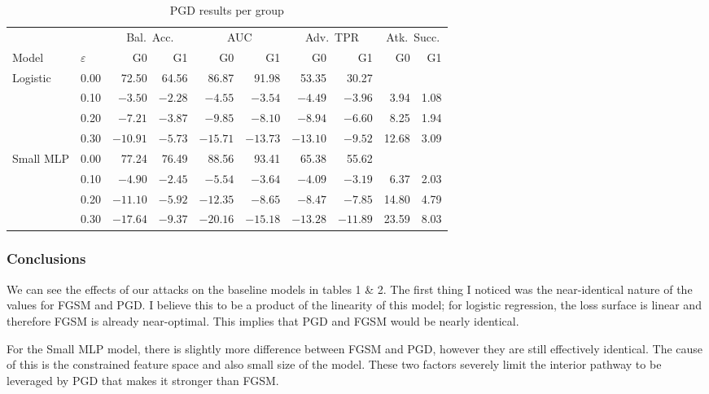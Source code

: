 \documentclass[11pt]{article}
\begin{document}
\begin{table}[H]
\centering
\caption{PGD results per group}
\label{tab:pgd-by-group}
\setlength{\tabcolsep}{4pt}
\begin{tabular}{ll rr rr rr rr}
\toprule
 & & \multicolumn{2}{c}{Bal.\ Acc.} & \multicolumn{2}{c}{AUC}
   & \multicolumn{2}{c}{Adv.\ TPR} & \multicolumn{2}{c}{Atk.\ Succ.} \\
\cmidrule(lr){3-4}\cmidrule(lr){5-6}\cmidrule(lr){7-8}\cmidrule(lr){9-10}
Model & $\varepsilon$ & G0 & G1 & G0 & G1 & G0 & G1 & G0 & G1 \\
\midrule
\multirow{4}{*}{Logistic}
 & 0.00 & 72.50 & 64.56 & 86.87 & 91.98 & 53.35 & 30.27 & & \\
 & 0.10 & $-3.50$ & $-2.28$ & $-4.55$ & $-3.54$ & $-4.49$ & $-3.96$ & 3.94 & 1.08 \\
 & 0.20 & $-7.21$ & $-3.87$ & $-9.85$ & $-8.10$ & $-8.94$ & $-6.60$ & 8.25 & 1.94 \\
 & 0.30 & $-10.91$ & $-5.73$ & $-15.71$ & $-13.73$ & $-13.10$ & $-9.52$ & 12.68 & 3.09 \\
\midrule
\multirow{4}{*}{Small MLP}
 & 0.00 & 77.24 & 76.49 & 88.56 & 93.41 & 65.38 & 55.62 & & \\
 & 0.10 & $-4.90$ & $-2.45$ & $-5.54$ & $-3.64$ & $-4.09$ & $-3.19$ & 6.37 & 2.03 \\
 & 0.20 & $-11.10$ & $-5.92$ & $-12.35$ & $-8.65$ & $-8.47$ & $-7.85$ & 14.80 & 4.79 \\
 & 0.30 & $-17.64$ & $-9.37$ & $-20.16$ & $-15.18$ & $-13.28$ & $-11.89$ & 23.59 & 8.03 \\
\bottomrule
\end{tabular}
\end{table}

\subsubsection*{Conclusions}

We can see the effects of our attacks on the baseline models in tables 1 \& 2.  The first thing I noticed was the near-identical nature of the values for FGSM and PGD. I believe this to be a product of the linearity of this model; for logistic regression, the loss surface is linear and therefore FGSM is already near-optimal. This implies that PGD and FGSM would be nearly identical. 

For the Small MLP model, there is slightly more difference between FGSM and PGD, however they are still effectively identical. The cause of this is the constrained feature space and also small size of the model. These two factors severely limit the interior pathway to be leveraged by PGD that makes it stronger than FGSM. 
\end{document}
